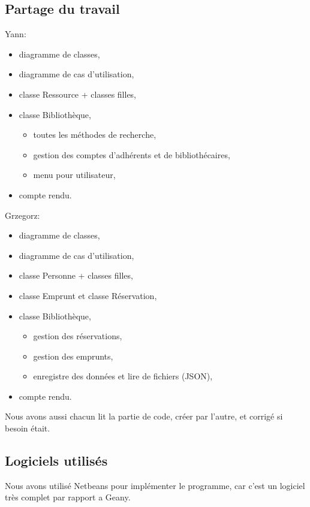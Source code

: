 \documentclass[10pt, a4paper]{article}
\begin{document}
		\subsection{Partage du travail}
		Yann:
		\begin{itemize}
			\item diagramme de classes,
			\item diagramme de cas d'utilisation,
			\item classe Ressource + classes filles,
			\item classe Bibliothèque,
			\begin{itemize}
				\item toutes les méthodes de recherche,
				\item gestion des comptes d'adhérents et de bibliothécaires,
				\item menu pour utilisateur,
			\end{itemize}
			\item compte rendu.
			
		\end{itemize}
		
		\bigbreak
		
		Grzegorz:
		\begin{itemize}
			\item diagramme de classes,
			\item diagramme de cas d'utilisation,			
			\item classe Personne + classes filles,
			\item classe Emprunt et classe Réservation,
			\item classe Bibliothèque,
			\begin{itemize}
				\item gestion des réservations,
				\item gestion des emprunts,
				\item enregistre des données et lire de fichiers (JSON),
			\end{itemize}
			\item compte rendu.
		\end{itemize}
		
		\bigbreak
		
		Nous avons aussi chacun lit la partie de code, créer par l'autre, et corrigé si besoin était.
		
		\subsection{Logiciels utilisés}
		Nous avons utilisé Netbeans pour implémenter le programme, car c'est un logiciel très complet par 
		rapport a Geany.
\end{document}
